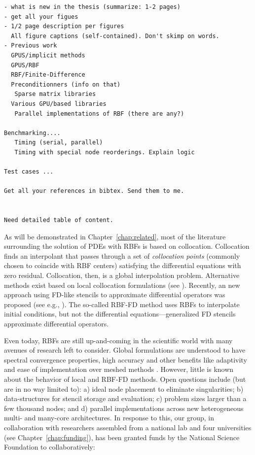 \begin{verbatim}
- what is new in the thesis (summarize: 1-2 pages)
- get all your figues
- 1/2 page description per figures
  All figure captions (self-contained). Don't skimp on words.
- Previous work
  GPUS/implicit methods
  GPUS/RBF
  RBF/Finite-Difference
  Preconditionners (info on that)
   Sparse matrix libraries
  Various GPU/based libraries
   Parallel implementations of RBF (there are any?)

Benchmarking....
   Timing (serial, parallel)
   Timing with special node reorderings. Explain logic

Test cases ...

Get all your references in bibtex. Send them to me.


Need detailed table of content.
 \end{verbatim}		






As will be demonstrated in Chapter~\ref{chap:related}, most of the literature surrounding the solution of PDEs with RBFs is based on 
collocation. Collocation finds an interpolant that passes through a set of \emph{collocation points} (commonly chosen to coincide with RBF centers) satisfying the differential equations with zero residual. Collocation, then, is a global interpolation problem. Alternative methods exist based on local collocation formulations (see \cite{Sarler:2006, Vertnik:2006,Stevens:2008a, Stevens:2009a, Stevens:2009b}). Recently, an new approach using FD-like stencils to approximate 
differential operators was proposed  (see e.g., \cite{Wright:2003, Wright:2006, Shu:2003, Chandhini:2007}). The so-called RBF-FD method uses RBFs to interpolate initial conditions, but not the differential equations---generalized FD stencils approximate differential operators. 

Even today, RBFs are still up-and-coming in the scientific world with many avenues of research left to consider. Global formulations are understood to have spectral convergence properties, high accuracy and other benefits like adaptivity and ease of implementation over meshed methods \cite{Fasshauer:2007}. However, little is known about the behavior of local and RBF-FD methods. Open questions include (but are in no way limited to): a) ideal node placement to eliminate singularities; b) data-structures for stencil storage and evaluation; c) problem sizes larger than a few thousand nodes; and d) parallel implementations across new heterogeneous multi- and many-core architectures. In response to this, our group, in collaboration with researchers assembled from a national lab and four universities (see Chapter~\ref{chap:funding}), has been granted funds by the National Science Foundation to collaboratively:

